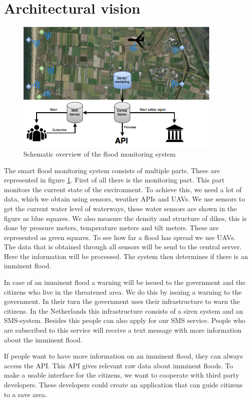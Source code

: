 \section{Architectural vision}
\begin{figure}[hb!]
\includegraphics[keepaspectratio=true,width=0.9\textwidth]{images/archVision.png}
\caption{Schematic overview of the flood monitoring system}
\label{fig:architectural-vision}
\end{figure}

The smart flood monitoring system consists of multiple parts. These are represented in figure \ref{fig:architectural-vision}. First of all there is the monitoring part. This part monitors the current state of the environment. To achieve this, we need a lot of data, which we obtain using sensors, weather APIs and UAVs. We use sensors to get the current water level of waterways, these water sensors are shown in the figure as blue squares. We also measure the density and structure of dikes, this is done by pressure meters, temperature meters and tilt meters. These are represented as green squares. To see how far a flood has spread we use UAVs. The data that is obtained through all sensors will be send to the central server. Here the information will be processed. The system then determines if there is an imminent flood.

In case of an imminent flood a warning will be issued to the government and the citizens who live in the threatened area. We do this by issuing a warning to the government. In their turn the government uses their infrastructure to warn the citizens. In the Netherlands this infrastructure consists of a siren system and an SMS-system. Besides this people can also apply for our SMS service. People who are subscribed to this service will receive a text message with more information about the imminent flood. 

If people want to have more information on an imminent flood, they can always access the API. This API gives relevant raw data about imminent floods. To make a usable interface for the citizens, we want to cooperate with third party developers. These developers could create an application that can guide citizens to a save area.
